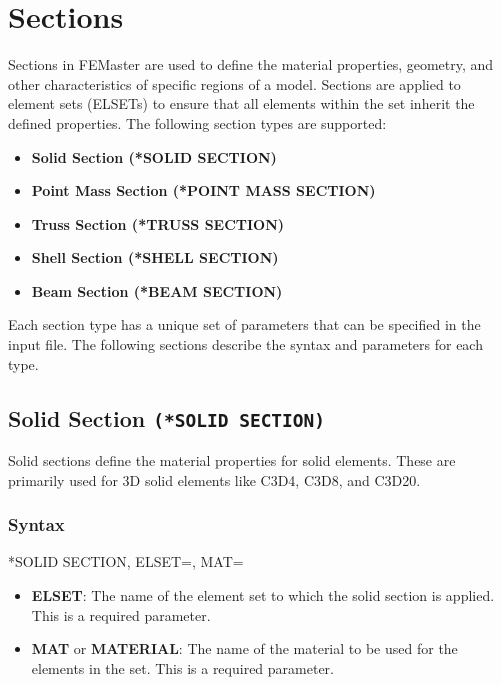 
\chapter{Sections}
\label{chap:sections}

Sections in FEMaster are used to define the material properties, geometry, and other characteristics of specific regions of a model. Sections are applied to element sets (ELSETs) to ensure that all elements within the set inherit the defined properties. The following section types are supported:

\begin{itemize}
\item \textbf{Solid Section (*SOLID SECTION)}
\item \textbf{Point Mass Section (*POINT MASS SECTION)}
\item \textbf{Truss Section (*TRUSS SECTION)}
\item \textbf{Shell Section (*SHELL SECTION)}
\item \textbf{Beam Section (*BEAM SECTION)}
\end{itemize}

Each section type has a unique set of parameters that can be specified in the input file. The following sections describe the syntax and parameters for each type.


\section{Solid Section \texttt{(*SOLID SECTION)}}
Solid sections define the material properties for solid elements. These are primarily used for 3D solid elements like C3D4, C3D8, and C3D20.

\subsection{Syntax}
\begin{codeBlock}
*SOLID SECTION, ELSET=, MAT=
\end{codeBlock}

\begin{itemize}
\item \textbf{ELSET}: The name of the element set to which the solid section is applied. This is a required parameter.
\item \textbf{MAT} or \textbf{MATERIAL}: The name of the material to be used for the elements in the set. This is a required parameter.
\end{itemize}

